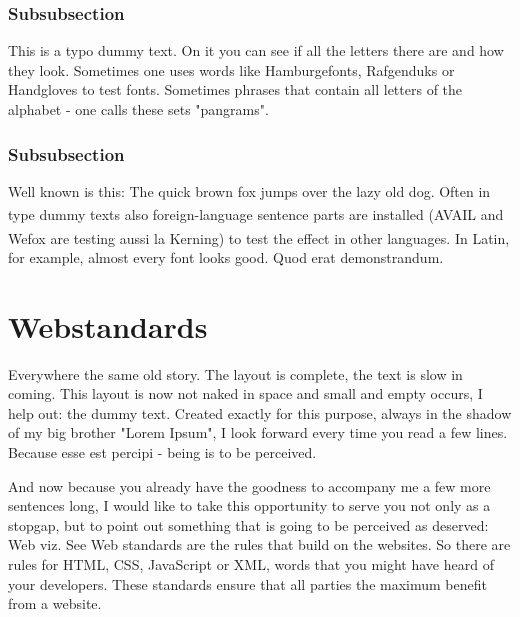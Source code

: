 \subsubsection{Subsubsection}

This is a typo dummy text. On it you can see if all the letters there are and how they look. Sometimes one uses words like Hamburgefonts, Rafgenduks or Handgloves to test fonts. Sometimes phrases that contain all letters of the alphabet - one calls these sets "pangrams". 

\subsubsection{Subsubsection}

Well known is this: The quick brown fox jumps over the lazy old dog. Often in type dummy texts also foreign-language sentence parts are installed (AVAIL\textsuperscript{\texttrademark} and Wefox\textsuperscript{\textregistered} are testing aussi la Kerning) to test the effect in other languages. In Latin, for example, almost every font looks good. Quod erat demonstrandum.

\section{Webstandards}
\label{sec:satzspiegeltest_webstandards}

Everywhere the same old story. The layout is complete, the text is slow in coming. This layout is now not naked in space and small and empty occurs, I help out: the dummy text. Created exactly for this purpose, always in the shadow of my big brother "Lorem Ipsum", I look forward every time you read a few lines. Because esse est percipi - being is to be perceived.

And now because you already have the goodness to accompany me a few more sentences long, I would like to take this opportunity to serve you not only as a stopgap, but to point out something that is going to be perceived as deserved: Web viz. See Web standards are the rules that build on the websites. So there are rules for HTML, CSS, JavaScript or XML, words that you might have heard of your developers. These standards ensure that all parties the maximum benefit from a website.

